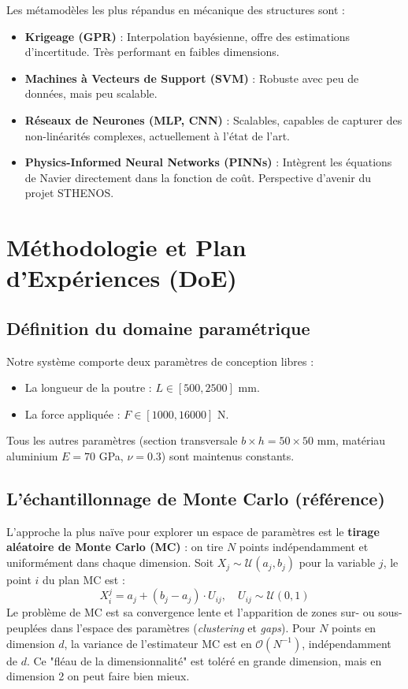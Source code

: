 \documentclass[journal, a4paper, twocolumn]{IEEEtran}
\begin{document}
Les métamodèles les plus répandus en mécanique des structures sont :
\begin{itemize}
    \item \textbf{Krigeage (GPR)} : Interpolation bayésienne, offre des estimations d'incertitude. Très performant en faibles dimensions.
    \item \textbf{Machines à Vecteurs de Support (SVM)} : Robuste avec peu de données, mais peu scalable.
    \item \textbf{Réseaux de Neurones (MLP, CNN)} : Scalables, capables de capturer des non-linéarités complexes, actuellement à l'état de l'art.
    \item \textbf{Physics-Informed Neural Networks (PINNs)} : Intègrent les équations de Navier directement dans la fonction de coût. Perspective d'avenir du projet STHENOS.
\end{itemize}

\section{Méthodologie et Plan d'Expériences (DoE)}

\subsection{Définition du domaine paramétrique}

Notre système comporte deux paramètres de conception libres :
\begin{itemize}
    \item La longueur de la poutre : $L \in [500, 2500]$ mm.
    \item La force appliquée : $F \in [1000, 16000]$ N.
\end{itemize}
Tous les autres paramètres (section transversale $b \times h = 50 \times 50$ mm, matériau aluminium $E = 70$ GPa, $\nu = 0.3$) sont maintenus constants.

\subsection{L'échantillonnage de Monte Carlo (référence)}

L'approche la plus naïve pour explorer un espace de paramètres est le \textbf{tirage aléatoire de Monte Carlo (MC)} : on tire $N$ points indépendamment et uniformément dans chaque dimension. Soit $X_j \sim \mathcal{U}(a_j, b_j)$ pour la variable $j$, le point $i$ du plan MC est :
\begin{equation}
    X_i^j = a_j + (b_j - a_j) \cdot U_{ij}, \quad U_{ij} \sim \mathcal{U}(0,1)
\end{equation}
Le problème de MC est sa convergence lente et l'apparition de zones sur- ou sous-peuplées dans l'espace des paramètres (\textit{clustering} et \textit{gaps}). Pour $N$ points en dimension $d$, la variance de l'estimateur MC est en $\mathcal{O}(N^{-1})$, indépendamment de $d$. Ce "fléau de la dimensionnalité" est toléré en grande dimension, mais en dimension 2 on peut faire bien mieux.
\end{document}
